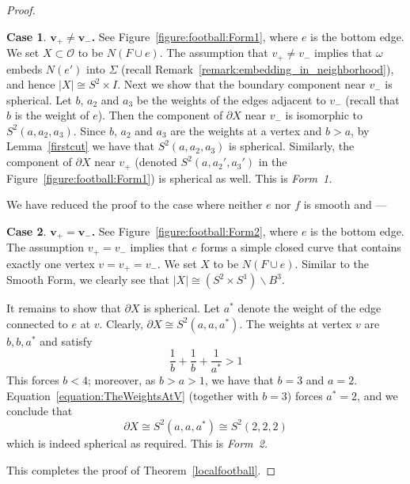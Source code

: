 \documentclass[12pt,reqno]{amsart}
\theoremstyle{plain}
\theoremstyle{definition}
\newtheorem{case}{Case}
\numberwithin{subcase}{case}
\theoremstyle{plain}
\theoremstyle{definition}
\def\vp{v_{+}}
\def\vm{v_{-}}
\newcommand{\OO}{\mathcal{O}}
\begin{document}
\begin{proof}
\bigskip

\begin{case}
\textbf{\(\boldsymbol{\vp \neq \vm}\).}
See Figure~\ref{figure:football:Form1}, where \(e\) is the bottom edge.
We set $X \subset \OO$ to be  \(N\left(F \cup e \right)\). The assumption that \(\vp \neq \vm\) implies that \(\omega\) embeds \(N(e')\) into \(\Sigma\) (recall Remark~\ref{remark:embedding_in_neighborhood}), and hence \(|X| \cong S^{2} \times I\).  
Next we show that the boundary component near \(\vm\) is spherical. 
Let \(b\), $a_2$ and $a_3$ be the weights of the edges adjacent to \(\vm\) (recall that \(b\) is the weight of \(e\)).  Then the component of \(\partial X\) near \(\vm\) is isomorphic to \(S^{2}(a,a_{2},a_{3})\). Since  \(b\), $a_2$ and $a_3$ are the weights at a vertex and \(b >a\), by Lemma~\ref{firstcut} we have that \(S^{2}(a,a_{2},a_{3})\) is spherical. 
Similarly, the component of \(\partial X\) near \(\vp\) (denoted \(S^{2}(a,a_{2}',a_{3}')\) in the Figure~\ref{figure:football:Form1}) is spherical as well.
This is \em Form~1\em.
\end{case}

We have reduced the proof to the case where neither \(e\) nor \(f\) is smooth and ---

\begin{case}
\label{FootballCase3}
\textbf{\(\boldsymbol{\vp = \vm}\).}
See Figure~\ref{figure:football:Form2}, where \(e\) is the bottom edge.
The assumption \(\vp = \vm\) implies that \(e\) forms a simple closed curve that contains exactly one vertex \(v = \vp = \vm\).  We set \(X\) to be \(N\left(F \cup e\right)\).  Similar to the Smooth Form, we clearly see that $|X| \cong \left(S^2\times S^1\right)\backslash B^3$.  

It remains to show that \(\partial X\) is spherical.  Let \(a^{*}\) denote the weight of the edge connected to \(e\) at \(v\).
Clearly, \(\partial X \cong S^{2}(a,a,a^{*})\).  The weights at vertex \(v\) are \(b,b,a^{*}\) and satisfy
\begin{equation}
\label{equation:TheWeightsAtV}
\frac{1}{b} + \frac{1}{b} + \frac{1}{a^{*}} > 1
\end{equation}
This forces \(b<4\); moreover, as \(b>a>1\), we have that \(b=3\) and \(a=2\).  Equation~\eqref{equation:TheWeightsAtV} (together with \(b=3\)) forces \(a^{*} = 2\), and we conclude that
\[
\partial X \cong
S^{2}(a,a,a^{*}) \cong 
S^{2}(2,2,2)
\]
which is indeed spherical as required.  This is \em Form~2.\em
\end{case}
This completes the proof of Theorem~\ref{localfootball}.
\end{proof}
\end{document}

